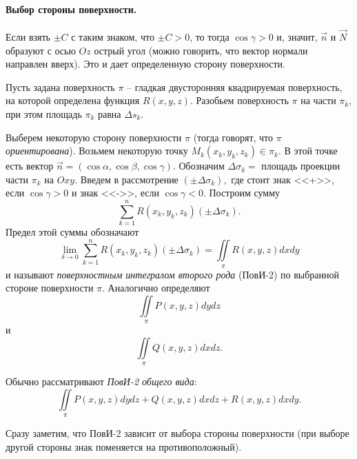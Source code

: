 \documentclass[../../main.tex]{subfiles}
\begin{document}
		\paragraph{Выбор стороны поверхности.}
		Если взять $\pm C$ с таким знаком, что $\pm C > 0$, то тогда $\cos \gamma
		 > 0$ и, значит, $\vec{n}$ и $\vec{N}$ образуют с осью
		  $Oz$ острый угол (можно говорить, что вектор нормали направлен вверх).
		   Это и дает определенную сторону поверхности.
		   
		Пусть задана поверхность $\pi$ \--- гладкая двусторонняя квадрируемая
	 поверхность, на которой определена функция $R(x,y,z)$. Разобьем поверхность $\pi$ на части	
	  $\pi_k$, при этом площадь $\pi_k$ равна $\Delta s_k$.
	  
	  Выберем некоторую сторону
	  поверхности $\pi$ (тогда говорят, что $\pi$ \emph{ориентирована}). Возьмем некоторую точку
      $M_k(x_k, y_k, z_k) \in \pi_k$. В этой точке есть вектор	
      $\vec{n} =
       (\cos \alpha, \cos \beta, \cos \gamma).$ Обозначим $\Delta \sigma_k = $
        площадь проекции части $\pi_k$ на $Oxy$. Введем в рассмотрение $(\pm
        \Delta\sigma_k),$ где стоит знак <<+>>, если $\cos \gamma > 0$ и 
        знак
         <<->>, если $\cos \gamma < 0$. Построим сумму 
         \[\sum\limits_{k=1}^n
         R(x_k, y_k, z_k)(\pm \Delta\sigma_k).\] Предел этой суммы обозначают
         \[\lim\limits_{\delta \to 0} \sum\limits_{k=1}^n R(x_k, y_k, z_k)(\pm
         \Delta\sigma_k) = \iint \limits_\pi R(x, y, z) dx dy\] и называют
         \emph{поверхностным интегралом второго рода} (ПовИ-2) по выбранной стороне
         поверхности $\pi$. Аналогично определяют \[\iint \limits_\pi P(x, y, 
         z) 
         dydz\] и \[\iint \limits_\pi Q(x, y, z) dxdz .\]
         
         Обычно рассматривают
          \emph{ПовИ-2 общего вида}:
		\[\iint \limits_\pi P(x, y, z) dydz + Q(x, y, z) dxdz
		 + R(x, y, z) dxdy. \]
		 
		Сразу заметим, что ПовИ-2 зависит от выбора стороны поверхности (при выборе другой
		 стороны знак поменяется на противоположный).
	
\end{document}
